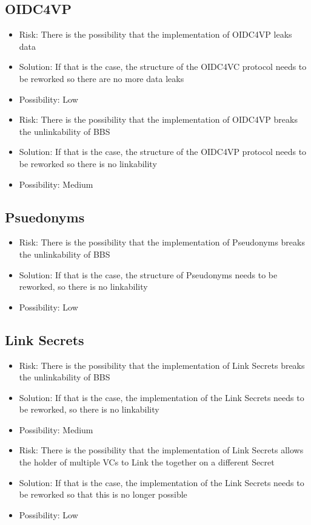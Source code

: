\documentclass[
	a4paper               %
	,BCOR=0mm            %
	,bibliography=totoc   %
	,listof=totoc         %
	,monolingual
	,twoside=false
]{bfhthesis}              %
\begin{document}
\subsection{OIDC4VP}
\begin{itemize}
	\item Risk: There is the possibility that the implementation of OIDC4VP leaks data
	\item Solution: If that is the case, the structure of the OIDC4VC protocol needs to be reworked so there are no more data leaks
	\item Possibility: Low
\end{itemize}
\begin{itemize}
	\item Risk: There is the possibility that the implementation of OIDC4VP breaks the unlinkability of BBS
	\item Solution: If that is the case, the structure of the OIDC4VP protocol needs to be reworked so there is no linkability
	\item Possibility: Medium
\end{itemize}

\subsection{Psuedonyms}
\begin{itemize}
	\item Risk: There is the possibility that the implementation of Pseudonyms breaks the unlinkability of BBS
	\item Solution: If that is the case, the structure of Pseudonyms needs to be reworked, so there is no linkability
	\item Possibility: Low
\end{itemize}

\subsection{Link Secrets}
\begin{itemize}
	\item Risk: There is the possibility that the implementation of Link Secrets breaks the unlinkability of BBS
	\item Solution: If that is the case, the implementation of the Link Secrets needs to be reworked, so there is no linkability
	\item Possibility: Medium
\end{itemize}
\begin{itemize}
	\item Risk: There is the possibility that the implementation of Link Secrets allows the holder of multiple VCs to Link the together on a different Secret
	\item Solution: If that is the case, the implementation of the Link Secrets needs to be reworked so that this is no longer possible
	\item Possibility: Low
\end{itemize}
\end{document}
